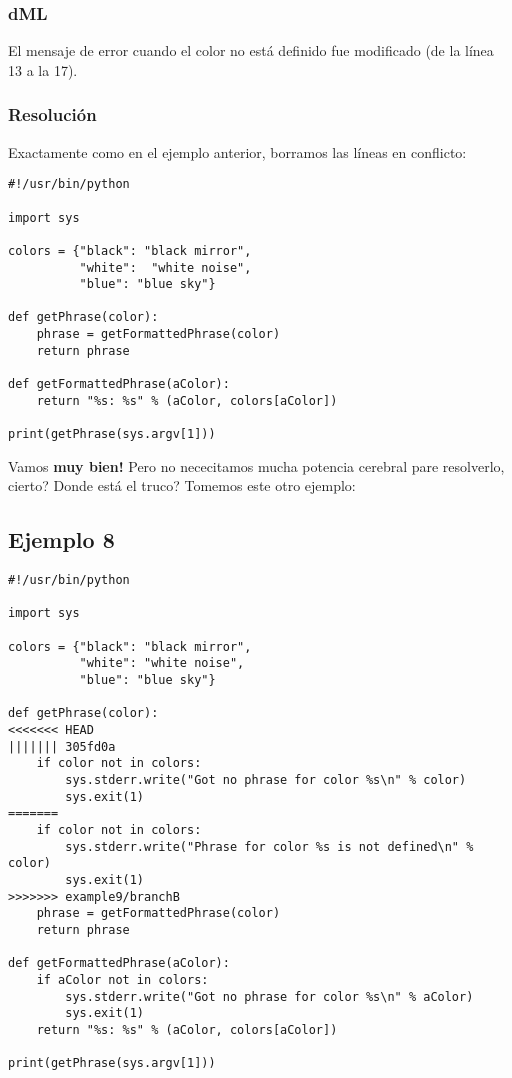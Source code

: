 \subsubsection{dML}
El mensaje de error cuando el color no está definido fue modificado (de la línea 13 a la 17).

\subsubsection{Resolución}
Exactamente como en el ejemplo anterior, borramos las líneas en conflicto:

\begin{lstlisting}[style=python_style,
	basicstyle=\small,
	caption={\bf Ejemplo 7} - resolución]
#!/usr/bin/python

import sys

colors = {"black": "black mirror",
          "white":  "white noise",
          "blue": "blue sky"}

def getPhrase(color):
    phrase = getFormattedPhrase(color)
    return phrase

def getFormattedPhrase(aColor):
    return "%s: %s" % (aColor, colors[aColor])

print(getPhrase(sys.argv[1]))
\end{lstlisting}
Vamos {\bf muy bien!} Pero no nececitamos mucha potencia cerebral pare resolverlo, cierto? Donde está el truco?
Tomemos este otro ejemplo:

\subsection{Ejemplo 8}
\label{example_08}

\begin{lstlisting}[style=python_style,
	basicstyle=\small,
	caption={\bf Ejemplo 8}]
#!/usr/bin/python

import sys

colors = {"black": "black mirror",
          "white": "white noise",
          "blue": "blue sky"}

def getPhrase(color):
<<<<<<< HEAD
||||||| 305fd0a
    if color not in colors:
        sys.stderr.write("Got no phrase for color %s\n" % color)
        sys.exit(1)
=======
    if color not in colors:
        sys.stderr.write("Phrase for color %s is not defined\n" % color)
        sys.exit(1)
>>>>>>> example9/branchB
    phrase = getFormattedPhrase(color)
    return phrase

def getFormattedPhrase(aColor):
    if aColor not in colors:
        sys.stderr.write("Got no phrase for color %s\n" % aColor)
        sys.exit(1)
    return "%s: %s" % (aColor, colors[aColor])

print(getPhrase(sys.argv[1]))
\end{lstlisting}

